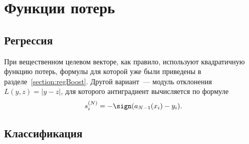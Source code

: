 \documentclass[12pt,fleqn]{article}
\begin{document}
\section{Функции потерь}
\subsection{Регрессия}
При вещественном целевом векторе, как правило, используют квадратичную функцию потерь,
формулы для которой уже были приведены в разделе~\ref{section:regBoost}.
Другой вариант~--- модуль отклонения~$L(y, z) = |y - z|$,
для которого антиградиент вычисляется по формуле
\[
    s_i^{(N)}
    =
    -
    \sign
    (a_{N - 1}(x_i) - y_i).
\]

\subsection{Классификация}
\end{document}
